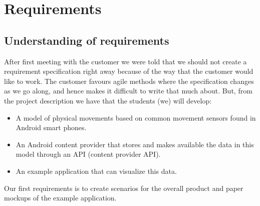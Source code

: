 \chapter{Requirements}
\section{Understanding of requirements}

After first meeting with the customer we were told that we should not create a requirement specification right away because of the way that the customer would like to work. The customer favours agile methods where the specification changes as we go along, and hence makes it difficult to write that much about. But, from the project description we have that the students (we) will develop:
\begin{itemize}
\item A model of physical movements based on common movement sensors found in Android smart phones.
\item An Android content provider that stores and makes available the data in this model through an API (content provider API).
\item An example application that can visualize this data.
\end{itemize}

Our first requirements is to create scenarios for the overall product and paper mockups of the example application.